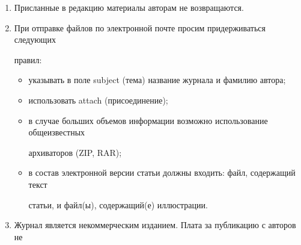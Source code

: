 {{\begin{enumerate}
аннотация (не более 100 слов), 


ключевые слова, 


литература. 


Ссылки на литературу в тексте статьи нумеруются (в квадратных скобках) и 


располагаются в порядке их первого упоминания.  В~списке литературы не должно быть 


позиций, на которые нет ссылки в тексте статьи. 


Все фамилии авторов, заглавия статей, названия книг, конференций и~т.\,п.\ даются на 


языке оригинала, если этот язык использует кириллический или латинский алфавит.\\[-13.5pt] 





\item Присланные в редакцию материалы авторам не возвращаются.\\[-13.5pt] 





\item При отправке файлов по электронной почте просим придерживаться следующих 


правил: 


\begin{itemize}


\item указывать в поле subject (тема) название журнала и фамилию автора;\\[-13.5pt] 


\item использовать attach (присоединение);\\[-13.5pt] 


\item в случае больших объемов информации возможно использование общеизвестных 


архиваторов (ZIP, RAR);\\[-13.5pt] 


\item в состав электронной версии статьи должны входить: файл, содержащий текст 


статьи, и файл(ы), содержащий(е) иллюстрации. 


\end{itemize}





\item Журнал является некоммерческим изданием. Плата за публикацию с авторов не 



\end{enumerate}}}
